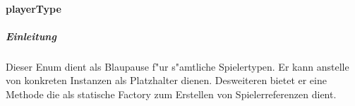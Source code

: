 \paragraph{playerType}
\label{par:playerType}
\subparagraph{Einleitung}
Dieser Enum dient als Blaupause f"ur s"amtliche Spielertypen. Er kann anstelle von konkreten Instanzen als Platzhalter dienen. Desweiteren bietet er eine Methode die als statische Factory zum Erstellen von Spielerreferenzen dient. 

